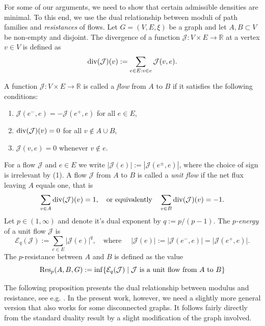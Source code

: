 \documentclass{amsart}
\newcommand{\Res}{{\rm Res}}
\newcommand{\divr}{{\rm div}}
\numberwithin{equation}{section}
\theoremstyle{definition}
\theoremstyle{remark}
\newcommand{\R}{\mathbb{R}}
\newcommand{\cE}{\mathcal{E}}
\newcommand{\cJ}{\mathcal{J}}
\begin{document}
For some of our arguments, we need to show that certain admissible densities are minimal. To this end, we use the dual relationship between moduli of path families and \emph{resistances} of flows. Let \(G=(V,E,\xi)\) be a graph and let \(A,B\subset V\) be non-empty and disjoint. The divergence of a function \(\cJ\colon V\times E\to \R\) at a vertex \(v\in V\) is defined as
        \[
            \divr(\cJ)(v):=\sum_{e\in E:v\in e}\cJ(v,e).
        \]
        
    A function \(\cJ\colon V\times E\to \R\) is called a \emph{flow} from \(A\) to \(B\) if it satisfies the following conditions:
    \begin{enumerate}
        \item \(\cJ(e^-,e)=-\cJ(e^+,e)\) for all \(e\in E\),
        \item \(\divr(\cJ)(v)=0\) for all \(v\not\in A\cup B\),
        \item \(\cJ(v,e)=0\) whenever \(v\not\in e\).
    \end{enumerate}
    For a flow $\cJ$ and $e\in E$ we write $|\cJ(e)|:=|\cJ(e^\pm,e)|$, where the choice of sign is irrelevant by (1). A flow \(\cJ\) from \(A\) to \(B\) is called a \emph{unit flow} if the net flux leaving \(A\) equals one, that is
        \[
            \sum_{v\in A}\divr(\cJ)(v)=1,\quad\text{or equivalently}\quad\sum_{v\in B}\divr(\cJ)(v)=-1.
        \]
    Let \(p\in(1,\infty)\) and denote it's dual exponent by \(q:=p/(p-1)\). The \emph{\(p\)-energy} of a unit flow \(\cJ\) is
        \[
            \cE_q(\cJ):=\sum_{e\in E}\lvert\cJ(e)\rvert^q,\quad\text{where }\quad\lvert\cJ(e)\rvert:=\lvert\cJ(e^-,e)\rvert=\lvert\cJ(e^+,e)\rvert.
        \]
    The \(p\)-resistance between \(A\) and \(B\) is defined as the value
        \[
            \Res_p(A,B,G):=\inf\{\cE_q(\cJ)\mid\cJ \text{ is a unit flow from }A\text{ to }B\}
        \]




The following proposition presents the dual relationship between modulus and resistance, see e.g. \cite[Theorem 5.1]{NakamuraYamasakiDuality}.
In the present work, however, we need a slightly more general version that also works for some disconnected graphs.
It follows fairly directly from the standard duality result by a slight modification of the graph involved.
\end{document}

